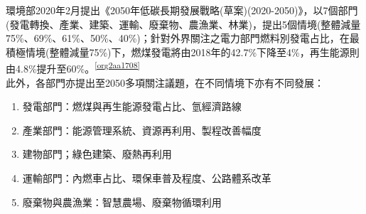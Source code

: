 \documentclass[a4paper,12pt]{article}
\begin{document}
環境部2020年2月提出《2050年低碳長期發展戰略(草案)(2020-2050)》，以7個部門(發電轉換、產業、建築、運輸、廢棄物、農漁業、林業)，提出5個情境(整體減量75\%、69\%、61\%、50\%、40\%)；針對外界關注之電力部門燃料別發電占比，在最積極情境(整體減量75\%)下，燃煤發電將由2018年的42.7\%下降至4\%，再生能源則由4.8\%提升至60\%。\textsuperscript{\ref{org2aa1708}}\\
此外，各部門亦提出至2050多項關注議題，在不同情境下亦有不同發展：\\
\begin{enumerate}
\item 發電部門：燃煤與再生能源發電占比、氫經濟路線\\
\item 產業部門：能源管理系統、資源再利用、製程改善幅度\\
\item 建物部門；綠色建築、廢熱再利用\\
\item 運輸部門：內燃車占比、環保車普及程度、公路體系改革\\
\item 廢棄物與農漁業：智慧農場、廢棄物循環利用\\
\end{enumerate}
\end{document}
